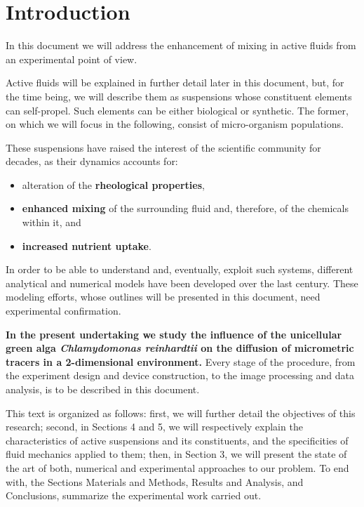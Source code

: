 \chapter{Introduction}
\label{introduction}

In this document we will address the enhancement of mixing in active fluids from an experimental point of view. 

Active fluids will be explained in further detail later in this document, but, for the time being, we will describe them as suspensions whose constituent elements can self-propel. Such elements can be either biological or synthetic. The former, on which we will focus in the following, consist of micro-organism populations.

These suspensions have raised the interest of the scientific community for decades, as their dynamics accounts for:

\begin{itemize}
	\item alteration of the \textbf{rheological properties},
	\item \textbf{enhanced mixing} of the surrounding fluid and, therefore, of the chemicals within it, and
	\item \textbf{increased nutrient uptake}.
\end{itemize}

In order to be able to understand and, eventually, exploit such systems, different analytical and numerical models have been developed over the last century. These modeling efforts, whose outlines will be presented in this document, need experimental confirmation.

\textbf{In the present undertaking we study the influence of the unicellular green alga \textit{Chlamydomonas reinhardtii} on the diffusion of micrometric tracers in a 2-dimensional environment.} 
Every stage of the procedure, from the experiment design and device construction, to the image processing and data analysis, is to be described in this document.

This text is organized as follows: first, we will further detail the objectives of this research; second,  in Sections 4 and 5, we will respectively explain the characteristics of active suspensions and its constituents, and the specificities of fluid mechanics applied to them; then, in Section 3, we will present the state of the art of both, numerical and experimental approaches to our problem. To end with, the Sections Materials and Methods, Results and Analysis, and Conclusions, summarize the experimental work carried out. 